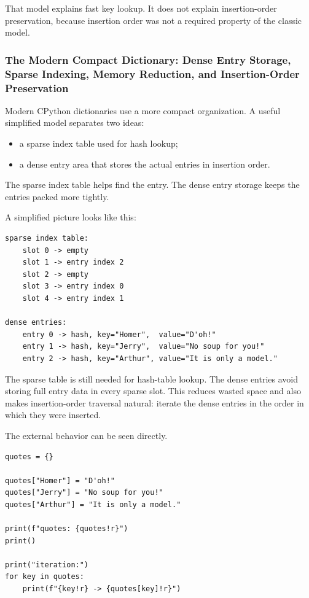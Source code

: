 That model explains fast key lookup. It does not explain insertion-order preservation, because insertion order was not a required property of the classic model.

\subsubsection{The Modern Compact Dictionary: Dense Entry Storage, Sparse Indexing, Memory Reduction, and Insertion-Order Preservation}

Modern CPython dictionaries use a more compact organization. A useful simplified model separates two ideas:

\begin{itemize}
    \item a sparse index table used for hash lookup;
    \item a dense entry area that stores the actual entries in insertion order.
\end{itemize}

The sparse index table helps find the entry. The dense entry storage keeps the entries packed more tightly.

A simplified picture looks like this:

\begin{verbatim}
sparse index table:
    slot 0 -> empty
    slot 1 -> entry index 2
    slot 2 -> empty
    slot 3 -> entry index 0
    slot 4 -> entry index 1

dense entries:
    entry 0 -> hash, key="Homer",  value="D'oh!"
    entry 1 -> hash, key="Jerry",  value="No soup for you!"
    entry 2 -> hash, key="Arthur", value="It is only a model."
\end{verbatim}

The sparse table is still needed for hash-table lookup. The dense entries avoid storing full entry data in every sparse slot. This reduces wasted space and also makes insertion-order traversal natural: iterate the dense entries in the order in which they were inserted.

The external behavior can be seen directly.

\begin{verbatim}
quotes = {}

quotes["Homer"] = "D'oh!"
quotes["Jerry"] = "No soup for you!"
quotes["Arthur"] = "It is only a model."

print(f"quotes: {quotes!r}")
print()

print("iteration:")
for key in quotes:
    print(f"{key!r} -> {quotes[key]!r}")
\end{verbatim}

